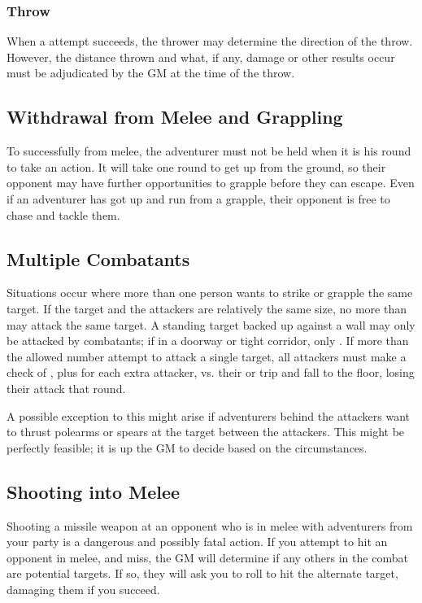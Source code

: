 \begin{multicols*}{2}
\subsubsection{Throw}
When a  attempt succeeds, the thrower may determine the direction of the throw. However, the distance thrown and what, if any, damage or other results occur must be adjudicated by the GM at the time of the throw.
\subsection{Withdrawal from Melee and Grappling}
To successfully  from melee, the adventurer must not be held when it is his round to take an action. It will take one round to get up from the ground, so their opponent may have further opportunities to grapple before they can escape. Even if an adventurer has got up and run from a grapple, their opponent is free to chase and tackle them.
\subsection{Multiple Combatants}
Situations occur where more than one person wants to strike or grapple the same target. If the target and the attackers are relatively the same size, no more than  may attack the same target. A standing target backed up against a wall may only be attacked by  combatants; if in a doorway or tight corridor, only . If more than the allowed number attempt to attack a single target, all attackers must make a check of , plus  for each extra attacker, vs. their \AGI or trip and fall to the floor, losing their attack that round.

A possible exception to this might arise if adventurers behind the attackers want to thrust polearms or spears at the target between the attackers. This might be perfectly feasible; it is up the GM to decide based on the circumstances.
\subsection{Shooting into Melee}
Shooting a missile weapon at an opponent who is in melee with adventurers from your party is a dangerous and possibly fatal action. If you attempt to hit an opponent in
melee, and miss, the GM will determine if any others in the combat are potential targets. If so, they will ask you to roll to hit the alternate target, damaging them if you succeed. 

\end{multicols*}
